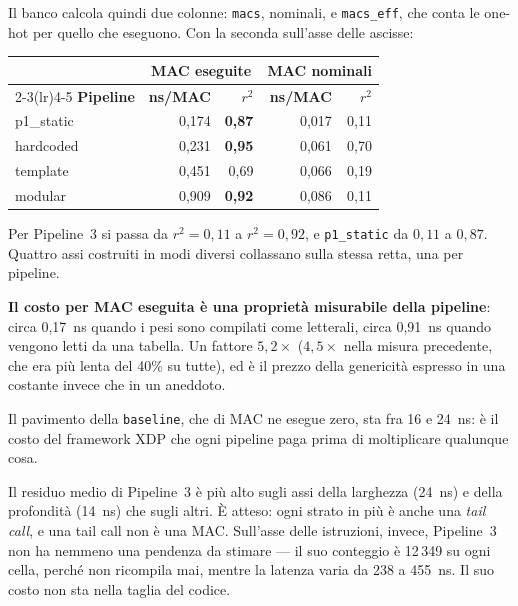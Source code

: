 \documentclass[11pt,a4paper,oneside]{report}
\begin{document}
Il banco calcola quindi due colonne: \texttt{macs}, nominali, e
\texttt{macs\_eff}, che conta le one-hot per quello che eseguono. Con la
seconda sull'asse delle ascisse:

\begin{center}
\small
\begin{tabular}{@{}lrrrr@{}}
\toprule
& \multicolumn{2}{c}{\textbf{MAC eseguite}} &
  \multicolumn{2}{c}{\textbf{MAC nominali}} \\
\cmidrule(lr){2-3}\cmidrule(lr){4-5}
\textbf{Pipeline} & \textbf{ns/MAC} & \textbf{$r^2$} &
\textbf{ns/MAC} & \textbf{$r^2$} \\
\midrule
p1\_static & 0,174 & \textbf{0,87} & 0,017 & 0,11 \\
hardcoded  & 0,231 & \textbf{0,95} & 0,061 & 0,70 \\
template   & 0,451 & 0,69          & 0,066 & 0,19 \\
modular    & 0,909 & \textbf{0,92} & 0,086 & 0,11 \\
\bottomrule
\end{tabular}
\end{center}

Per Pipeline~3 si passa da $r^2 = 0{,}11$ a $r^2 = 0{,}92$, e
\texttt{p1\_static} da $0{,}11$ a $0{,}87$. Quattro assi costruiti in modi
diversi collassano sulla stessa retta, una per pipeline.

\begin{lezione}
\textbf{Il costo per MAC eseguita è una proprietà misurabile della pipeline}:
circa 0,17~ns quando i pesi sono compilati come letterali, circa 0,91~ns quando
vengono letti da una tabella. Un fattore $5{,}2\times$ ($4{,}5\times$ nella misura
precedente, che era più lenta del 40\% su tutte), ed è il prezzo della
genericità espresso in una costante invece che in un aneddoto.
\end{lezione}

Il pavimento della \texttt{baseline}, che di MAC ne esegue zero, sta fra 16 e
24~ns: è il costo del framework XDP che ogni pipeline paga prima di
moltiplicare qualunque cosa.

\begin{prima}
Il residuo medio di Pipeline~3 è più alto sugli assi della larghezza (24~ns) e
della profondità (14~ns) che sugli altri. È atteso: ogni strato in più è anche
una \emph{tail call}, e una tail call non è una MAC. Sull'asse delle
istruzioni, invece, Pipeline~3 non ha nemmeno una pendenza da stimare --- il
suo conteggio è 12\,349 su ogni cella, perché non ricompila mai, mentre la
latenza varia da 238 a 455~ns. Il suo costo non sta nella taglia del codice.
\end{prima}
\end{document}
